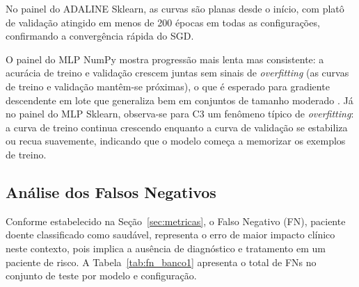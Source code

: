 No painel do ADALINE Sklearn, as curvas são planas desde o início, com platô de validação atingido em menos de 200 épocas em todas as configurações, confirmando a convergência rápida do SGD.

O painel do MLP NumPy mostra progressão mais lenta mas consistente: a acurácia de treino e validação crescem juntas sem sinais de \textit{overfitting} (as curvas de treino e validação mantêm-se próximas), o que é esperado para gradiente descendente em lote que generaliza bem em conjuntos de tamanho moderado \cite{braga2007}. Já no painel do MLP Sklearn, observa-se para C3 um fenômeno típico de \textit{overfitting}: a curva de treino continua crescendo enquanto a curva de validação se estabiliza ou recua suavemente, indicando que o modelo começa a memorizar os exemplos de treino.

\subsection{Análise dos Falsos Negativos}
\label{sec:banco1_fn}

Conforme estabelecido na Seção~\ref{sec:metricas}, o Falso Negativo (FN), paciente doente classificado como saudável, representa o erro de maior impacto clínico neste contexto, pois implica a ausência de diagnóstico e tratamento em um paciente de risco. A Tabela~\ref{tab:fn_banco1} apresenta o total de FNs no conjunto de teste por modelo e configuração.

\begin{table}[H]
\centering
\caption[Falsos Negativos dos modelos no Banco 1 por configuração]{Total de Falsos Negativos (FN) dos modelos no Banco 1 por configuração de treinamento. Conjunto de teste: 276 pacientes (153 doentes / 123 saudáveis).}
\label{tab:fn_banco1}
\end{table}


